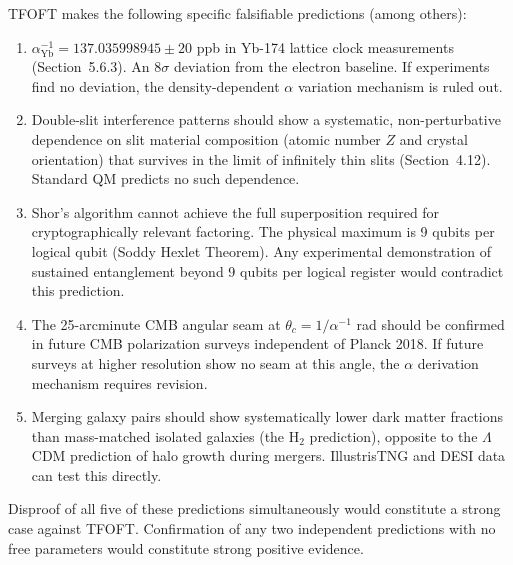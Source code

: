   TFOFT makes the following specific falsifiable predictions (among others):
  \begin{enumerate}
    \item $\alpha^{-1}_{\text{Yb}} = 137.035998945 \pm 20$ ppb in Yb-174 lattice
          clock measurements (Section~5.6.3). An $8\sigma$ deviation from the
          electron baseline. If experiments find no deviation, the density-dependent
          $\alpha$ variation mechanism is ruled out.
    \item Double-slit interference patterns should show a systematic, non-perturbative
          dependence on slit material composition (atomic number $Z$ and crystal
          orientation) that survives in the limit of infinitely thin slits
          (Section~4.12). Standard QM predicts no such dependence.
    \item Shor's algorithm cannot achieve the full superposition required for
          cryptographically relevant factoring. The physical maximum is 9 qubits
          per logical qubit (Soddy Hexlet Theorem). Any experimental demonstration
          of sustained entanglement beyond 9 qubits per logical register would
          contradict this prediction.
    \item The 25-arcminute CMB angular seam at $\theta_c = 1/\alpha^{-1}$ rad
          should be confirmed in future CMB polarization surveys independent of
          Planck 2018. If future surveys at higher resolution show no seam at this
          angle, the $\alpha$ derivation mechanism requires revision.
    \item Merging galaxy pairs should show systematically lower dark matter fractions
          than mass-matched isolated galaxies (the H$_2$ prediction), opposite to
          the $\Lambda$CDM prediction of halo growth during mergers. IllustrisTNG
          and DESI data can test this directly.
  \end{enumerate}

  Disproof of all five of these predictions simultaneously would constitute a strong
  case against TFOFT. Confirmation of any two independent predictions with no free
  parameters would constitute strong positive evidence.
